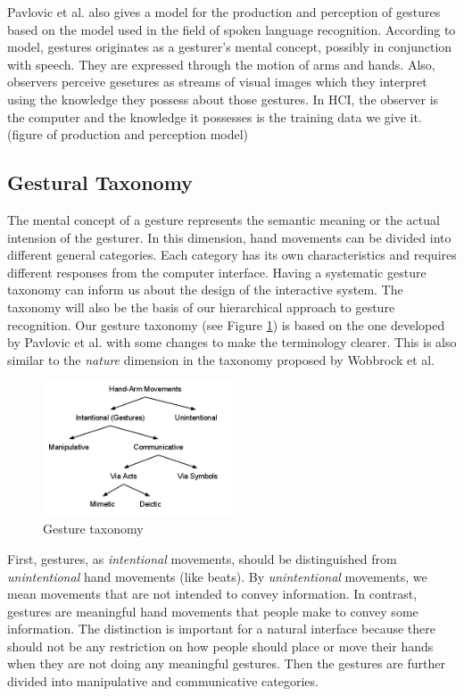 Pavlovic et al. \cite{Pavlovic97} also gives a model for the production and
perception of gestures based on the model used in the field of spoken language
recognition. According to model, gestures originates as a gesturer's mental
concept, possibly in conjunction with speech. They are expressed through the
motion of arms and hands. Also, observers perceive gesetures as streams of
visual images which they interpret using the knowledge they possess about those
gestures. In HCI, the observer is the computer and the knowledge it possesses is
the training data we give it. (figure of production and perception model)

\subsection{Gestural Taxonomy}\label{sec:taxonomy}
The mental concept of a gesture represents the semantic meaning or the
actual intension of the gesturer. In this dimension, hand movements can be
divided into different general categories. Each category has its own characteristics and requires different responses from the computer interface. Having a systematic gesture taxonomy can inform
us about the design of the interactive system. The taxonomy will also be the
basis of our hierarchical approach to gesture recognition. Our gesture taxonomy (see
Figure \ref{fig:taxonomy}) is based on the one developed by Pavlovic et al.
\cite{Pavlovic97} with some changes to make the terminology clearer. This is
also similar to the \textit{nature} dimension in the taxonomy proposed by
Wobbrock et al.
\cite{wobbrock09}

\begin{figure}[h]
  \centering
  \includegraphics[width=0.5\textwidth]{figures/taxonomy.png} 
  \caption{Gesture taxonomy}
  \label{fig:taxonomy}
\end{figure}

First, gestures, as \textit{intentional} movements, should be distinguished from
\textit{unintentional} hand movements (like beats). By \textit{unintentional}
movements, we mean movements that are not intended to convey information. In
contrast, gestures are meaningful hand movements that people make to convey some
information. The distinction is important for a natural interface because there
should not be any restriction on how people should place or move their hands
when they are not doing any meaningful gestures. Then the gestures are further 
divided into manipulative and communicative categories.

